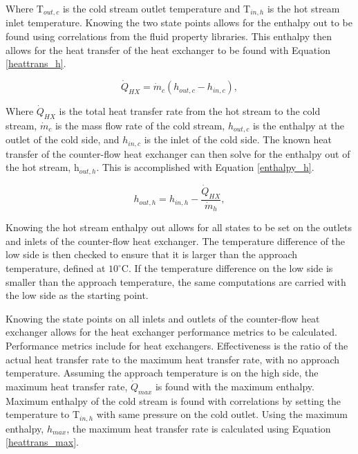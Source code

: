 Where T$_{out,c}$ is the cold stream outlet temperature and T$_{in,h}$ is the hot stream inlet temperature. Knowing the two state points allows for the enthalpy out to be found using correlations from the fluid property libraries. This enthalpy then allows for the heat transfer of the heat exchanger to be found with Equation \ref{heattrans_h}.

\begin{equation}
    \label{heattrans_h}
     \dot{Q}_{HX} = \dot{m}_{c}(h_{out,c}-h_{in,c}),
 \end{equation}

 Where $\dot{Q}_{HX}$ is the total heat transfer rate from the hot stream to the cold stream, $\dot{m}_{c}$ is the mass flow rate of the cold stream, $h_{out,c}$ is the enthalpy at the outlet of the cold side, and $h_{in,c}$ is the inlet of the cold side.
 The known heat transfer of the counter-flow heat exchanger can then solve for the enthalpy out of the hot stream, h$_{out,h}$. This is accomplished with Equation \ref{enthalpy_h}.

 \begin{equation}
    \label{enthalpy_h}
     h_{out,h} = h_{in,h} - \frac{\dot{Q}_{HX}}{\dot{m}_{h}},
 \end{equation}

Knowing the hot stream enthalpy out allows for all states to be set on the outlets and inlets of the counter-flow heat exchanger. The temperature difference of the low side is then checked to ensure that it is larger than the approach temperature, defined at $10^\circ$C. If the temperature difference on the low side is smaller than the approach temperature, the same computations are carried with the low side as the starting point.

Knowing the state points on all inlets and outlets of the counter-flow heat exchanger allows for the heat exchanger performance metrics to be calculated. Performance metrics include  for heat exchangers. Effectiveness is the ratio of the actual heat transfer rate to the maximum heat transfer rate,  with no approach temperature. Assuming the approach temperature is on the high side, the maximum heat transfer rate, $\dot{Q}_{max}$ is found with the maximum enthalpy. Maximum enthalpy of the cold stream is found with correlations by setting the temperature to T$_{in,h}$ with same pressure on the cold outlet. Using the maximum enthalpy, $h_{max}$, the maximum heat transfer rate is calculated using Equation \ref{heattrans_max}.

